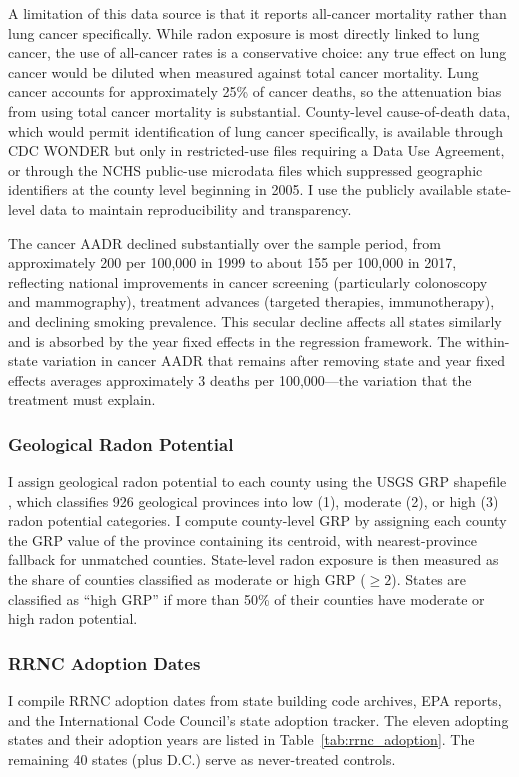 \documentclass[12pt]{article}
\begin{document}
A limitation of this data source is that it reports all-cancer mortality rather than lung cancer specifically. While radon exposure is most directly linked to lung cancer, the use of all-cancer rates is a conservative choice: any true effect on lung cancer would be diluted when measured against total cancer mortality. Lung cancer accounts for approximately 25\% of cancer deaths, so the attenuation bias from using total cancer mortality is substantial. County-level cause-of-death data, which would permit identification of lung cancer specifically, is available through CDC WONDER but only in restricted-use files requiring a Data Use Agreement, or through the NCHS public-use microdata files which suppressed geographic identifiers at the county level beginning in 2005. I use the publicly available state-level data to maintain reproducibility and transparency.

The cancer AADR declined substantially over the sample period, from approximately 200 per 100,000 in 1999 to about 155 per 100,000 in 2017, reflecting national improvements in cancer screening (particularly colonoscopy and mammography), treatment advances (targeted therapies, immunotherapy), and declining smoking prevalence. This secular decline affects all states similarly and is absorbed by the year fixed effects in the regression framework. The within-state variation in cancer AADR that remains after removing state and year fixed effects averages approximately 3 deaths per 100,000---the variation that the treatment must explain.

\subsubsection*{Geological Radon Potential} I assign geological radon potential to each county using the USGS GRP shapefile \citep{gundersen1993geologic}, which classifies 926 geological provinces into low (1), moderate (2), or high (3) radon potential categories. I compute county-level GRP by assigning each county the GRP value of the province containing its centroid, with nearest-province fallback for unmatched counties. State-level radon exposure is then measured as the share of counties classified as moderate or high GRP ($\geq 2$). States are classified as ``high GRP'' if more than 50\% of their counties have moderate or high radon potential.

\subsubsection*{RRNC Adoption Dates} I compile RRNC adoption dates from state building code archives, EPA reports, and the International Code Council's state adoption tracker. The eleven adopting states and their adoption years are listed in Table~\ref{tab:rrnc_adoption}. The remaining 40 states (plus D.C.) serve as never-treated controls.
\end{document}
